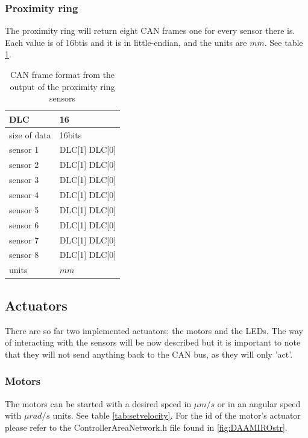 \documentclass[12pt]{report}%
\begin{document}
\subsubsection{Proximity ring}
The proximity ring will return eight CAN frames one for every sensor there is. Each value is of 16btis and it is in little-endian, and the units are $mm$. See table \ref{tab:proxring}.

\begin{table}[h!]
\centering
\begin{tabular}{|l|l|}
	\hline
	DLC						&	16												\\	\hline
	size of data	&	16bits										\\	\hline
	sensor 1			&	DLC[1] DLC[0]							\\	\hline
  sensor 2			&	DLC[1] DLC[0]							\\	\hline
	sensor 3			&	DLC[1] DLC[0]							\\	\hline
	sensor 4			&	DLC[1] DLC[0]							\\	\hline
	sensor 5			&	DLC[1] DLC[0]							\\	\hline
  sensor 6			&	DLC[1] DLC[0]							\\	\hline
	sensor 7			&	DLC[1] DLC[0]							\\	\hline
	sensor 8			&	DLC[1] DLC[0]							\\	\hline
	units					&	$mm$											\\	\hline
\end{tabular}
\caption{\label{tab:proxring} CAN frame format from the output of the proximity ring sensors}
\end{table}

\subsection{Actuators}
There are so far two implemented actuators: the motors and the LEDs. The way of interacting with the sensors will be now described but it is important to note that they will not send anything back to the CAN bus, as they will only 'act'.

\subsubsection{Motors}
The motors can be started with a desired speed in $\mu m/s$ or in an angular speed with $\mu rad/s$ units. See table \ref{tab:setvelocity}. For the id of the motor's actuator please refer to the ControllerAreaNetwork.h file found in \ref{fig:DAAMIROstr}.
\end{document}

